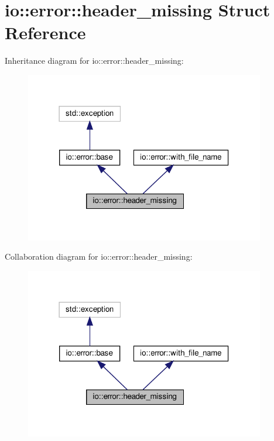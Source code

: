 \hypertarget{structio_1_1error_1_1header__missing}{}\section{io\+:\+:error\+:\+:header\+\_\+missing Struct Reference}
\label{structio_1_1error_1_1header__missing}


Inheritance diagram for io\+:\+:error\+:\+:header\+\_\+missing\+:\nopagebreak
\begin{figure}[H]
\begin{center}
\leavevmode
\includegraphics[width=297pt]{structio_1_1error_1_1header__missing__inherit__graph}
\end{center}
\end{figure}


Collaboration diagram for io\+:\+:error\+:\+:header\+\_\+missing\+:\nopagebreak
\begin{figure}[H]
\begin{center}
\leavevmode
\includegraphics[width=297pt]{structio_1_1error_1_1header__missing__coll__graph}
\end{center}
\end{figure}
